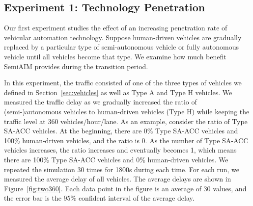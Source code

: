 

\subsection{Experiment 1: Technology Penetration}

Our first experiment studies the effect of an increasing penetration rate
of vehicular automation technology.  Suppose human-driven vehicles are
gradually replaced by a particular type of semi-autonomous vehicle or
fully autonomous vehicle until all vehicles become that type.  We examine how
much benefit SemiAIM provides during the transition period.

In this experiment, the traffic consisted of one of the three types of
vehicles we defined in Section~\ref{sec:vehicles} as well as Type A
and Type H vehicles.  We measured the traffic delay as we gradually
increased the ratio of (semi-)autonomous vehicles to human-driven
vehicles (Type H) while keeping the traffic level at 360
vehicles/hour/lane.  As an example, consider the ratio of Type SA-ACC
vehicles.  At the beginning, there are 0\% Type SA-ACC vehicles and
100\% human-driven vehicles, and the ratio is 0.  As the number of
Type SA-ACC vehicles increases, the ratio increases and eventually
becomes 1, which means there are 100\% Type SA-ACC vehicles and 0\%
human-driven vehicles.  We repeated the simulation 30 times for 1800s
during each time.  For each run, we measured the average delay of all
vehicles.  The average delays are shown in Figure~\ref{fig:two360}.
Each data point in the figure is an average of 30 values, and the
error bar is the 95\% confident interval of the average delay.
 
